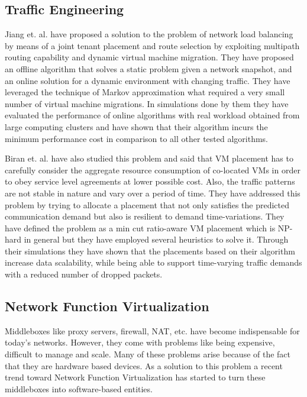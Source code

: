 \subsection{Traffic Engineering}
Jiang et. al. \cite{jiang2012joint} have proposed a solution to the problem of network load balancing by means of a joint tenant placement and route selection by exploiting multipath routing capability and dynamic virtual machine migration. They have proposed an offline algorithm that solves a static problem given a network snapshot, and an online solution for a dynamic environment with changing traffic. They have leveraged the technique of Markov approximation what required a very small number of virtual machine migrations. In simulations done by them they have evaluated the performance of online algorithms with real workload obtained from large computing clusters and have shown that their algorithm incurs the minimum performance cost in comparison to all other tested algorithms.

Biran et. al. \cite{biran2012stable} have also studied this problem and said that VM placement has to carefully consider the aggregate resource consumption of co-located VMs in order to obey service level agreements at lower possible cost. Also, the traffic patterns are not stable in nature and vary over a period of time. They have addressed this problem by trying to allocate a placement that not only satisfies the predicted communication demand but also is resilient to demand time-variations. They have defined the problem as a min cut ratio-aware VM placement which is NP-hard in general but they have employed several heuristics to solve it. Through their simulations they have shown that the placements based on their algorithm increase data scalability, while being able to support time-varying traffic demands with a reduced number of dropped packets. 

\subsection{Network Function Virtualization}
Middleboxes like proxy servers, firewall, NAT, etc. have become indispensable for today's networks. However, they come with problems like being expensive, difficult to manage and scale. Many of these problems arise because of the fact that they are hardware based devices. As a solution to this problem a recent trend toward Network Function Virtualization has started to turn these middleboxes into software-based entities.

